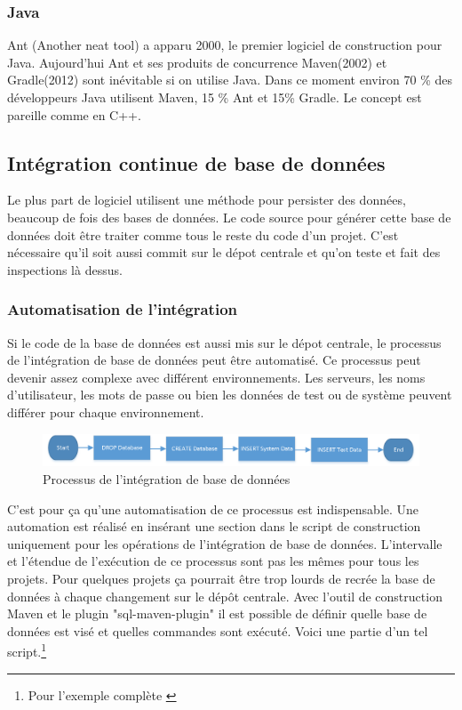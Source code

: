 \subsubsection{Java}
Ant (Another neat tool) a apparu 2000, le premier logiciel de construction pour Java.
Aujourd'hui Ant et ses produits de concurrence Maven(2002) et Gradle(2012) sont inévitable si on utilise Java.
Dans ce moment environ 70 \% des développeurs Java utilisent Maven, 15 \% Ant et 15\% Gradle. Le concept est pareille comme en C++.


\subsection{Intégration continue de base de données}

Le plus part de logiciel utilisent une méthode pour persister des données, beaucoup de fois des bases de données. Le code source pour générer cette base de données doit être traiter comme tous le reste du code d'un projet. C'est nécessaire qu'il soit aussi commit sur le dépot centrale et qu'on teste et fait des inspections là dessus.

\subsubsection{Automatisation de l'intégration}
Si le code de la base de données est aussi mis sur le dépot centrale, le processus de l'intégration de base de données peut être automatisé. Ce processus peut devenir assez complexe avec différent environnements. Les serveurs, les noms d'utilisateur, les mots de passe ou bien les données de test ou de système peuvent différer pour chaque environnement.
\begin{figure}[H]
	\centering
		\includegraphics[scale=1]{bilder/database_integration}
	\caption{Processus de l'intégration de base de données}
	\label{fig:processus}
\end{figure}

C'est pour ça qu'une automatisation de ce processus est indispensable. Une automation est réalisé en insérant une section dans le script de construction uniquement pour les opérations de l'intégration de base de données. L'intervalle et l'étendue de l'exécution de ce processus sont pas les mêmes pour tous les projets. Pour quelques projets ça pourrait être trop lourds de recrée la base de données à chaque changement sur le dépôt centrale. Avec l'outil de construction Maven et le plugin "sql-maven-plugin" il est possible de définir quelle base de données est visé et quelles commandes sont exécuté. Voici une partie d'un tel script.\footnote{Pour l'exemple complète \cite{mvnsql}}


